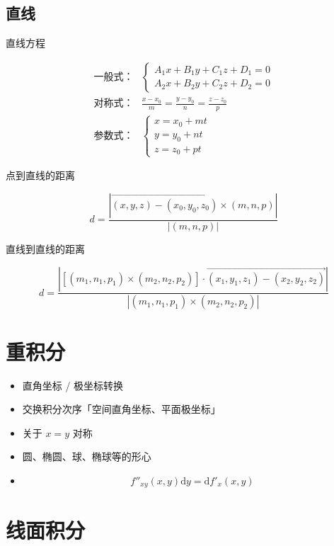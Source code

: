 \documentclass{article}
\begin{document}
\subsection{直线}

直线方程

\begin{align*}
    \text{一般式：} & \begin{cases}
                      A_1 x + B_1 y + C_1 z + D_1 = 0 \\
                      A_2 x + B_2 y + C_2 z + D_2 = 0
                  \end{cases}                           \\
    \text{对称式：} & \frac{x - x_0}{m} = \frac{y - y_0}{n} = \frac{z - z_0}{p} \\
    \text{参数式：} & \begin{cases}
                      x = x_0 + m t \\
                      y = y_0 + n t \\
                      z = z_0 + p t
                  \end{cases}
\end{align*}

点到直线的距离

\[ d = \frac{\left|\overrightarrow{(x, y, z) - (x_0, y_0, z_0)} \times (m, n, p)\right|}{|(m, n, p)|} \]

直线到直线的距离

\[ d = \frac{\left|\left[(m_1, n_1, p_1) \times (m_2, n_2, p_2) \right] \cdot \overrightarrow{(x_1, y_1, z_1) - (x_2, y_2, z_2)}\right|}{\left|(m_1, n_1, p_1) \times (m_2, n_2, p_2)\right|} \]

\section{重积分}

\begin{itemize}
    \item 直角坐标 / 极坐标转换
    \item 交换积分次序「空间直角坐标、平面极坐标」
    \item 关于 $x = y$ 对称
    \item 圆、椭圆、球、椭球等的形心
    \item \[ f''_{xy}(x, y) \mathrm{d} y = \mathrm{d} f'_x(x, y) \]
\end{itemize}

\section{线面积分}
\end{document}
